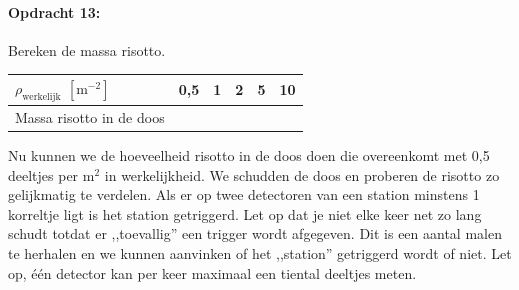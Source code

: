 \begin{minipage}[t]{1\columnwidth}%

\paragraph{Opdracht 13:}

Bereken de massa risotto.

\bigskip{}

\begin{tabular}{|x{.3\textwidth}|x{.1\textwidth}|x{.1\textwidth}
                |x{.1\textwidth}|x{.1\textwidth}|x{.1\textwidth}|}
    \hline
    $\rho_\textrm{werkelijk}$ $\left[\mathrm{m^{-2}}\right]$ & 0,5 & 1 & 2 & 5 & 10 \\
    \hline
    Massa risotto in de doos &  &  &  &  & \\
    \hline
\end{tabular}
\end{minipage}

\bigskip{}


Nu kunnen we de hoeveelheid risotto in de doos doen die overeenkomt met
0,5 deeltjes per $\mathrm{m^{2}}$ in werkelijkheid. We schudden de doos
en proberen de risotto zo gelijkmatig te verdelen. Als er op twee
detectoren van een station minstens 1 korreltje ligt is het station
getriggerd. Let op dat je niet elke keer net zo lang schudt totdat er ,,toevallig''
een trigger wordt afgegeven. Dit is een aantal malen te herhalen en we
kunnen aanvinken of het ,,station'' getriggerd wordt of niet. Let op,
één detector kan per keer maximaal een tiental deeltjes meten.

